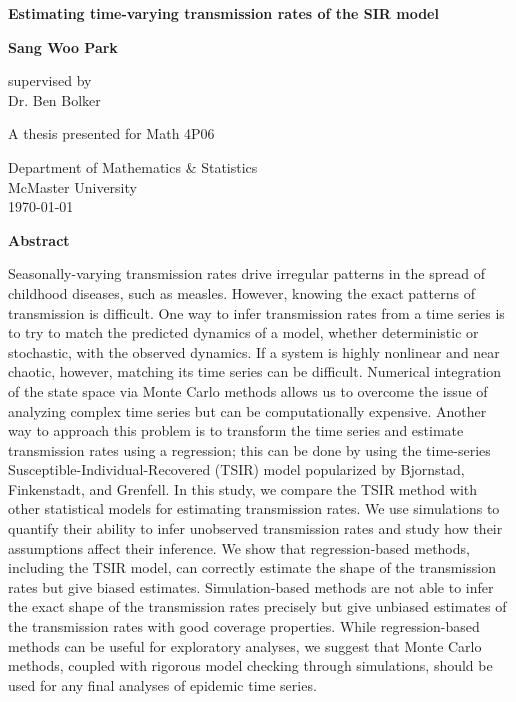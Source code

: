 \documentclass{article}
\begin{document}
\begin{titlepage}
   \begin{center}
       \vspace*{1cm}
 
       \textbf{Estimating time-varying transmission rates of the SIR model}
 
       \vspace{1.5cm}
 
       \textbf{Sang Woo Park}
 
       \vfill
 
       supervised by \\ \vspace{0.2cm}
       Dr. Ben Bolker
       
 	   \vspace{1.5cm}
 
       A thesis presented for Math 4P06\\
 
       \vspace{0.8cm}
 
       Department of Mathematics \& Statistics\\
       McMaster University\\
       \today
 
   \end{center}
\end{titlepage}
\pagebreak

\begin{center}
\textbf{Abstract}
\end{center}

Seasonally-varying transmission rates drive irregular patterns in the spread of childhood diseases, such as measles.
However, knowing the exact patterns of transmission is difficult.
One way to infer transmission rates from a time series is to try to match the predicted dynamics of a model, whether deterministic or stochastic, with the observed dynamics.
If a system is highly nonlinear and near chaotic, however, matching its time series can be difficult.
Numerical integration of the state space via Monte Carlo methods allows us to overcome the issue of analyzing complex time series but can be computationally expensive.
Another way to approach this problem is to transform the time series and estimate transmission rates using a regression;
this can be done by using the time-series Susceptible-Individual-Recovered (TSIR) model popularized by Bjornstad, Finkenstadt, and Grenfell.
In this study, we compare the TSIR method with other statistical models for estimating transmission rates.
We use simulations to quantify their ability to infer unobserved transmission rates and study how their assumptions affect their inference.
We show that regression-based methods, including the TSIR model, can correctly estimate the shape of the transmission rates but give biased estimates.
Simulation-based methods are not able to infer the exact shape of the transmission rates precisely but give unbiased estimates of the transmission rates with good coverage properties.
While regression-based methods can be useful for exploratory analyses, we suggest that Monte Carlo methods, coupled with rigorous model checking through simulations, should be used for any final analyses of epidemic time series.
\end{document}
